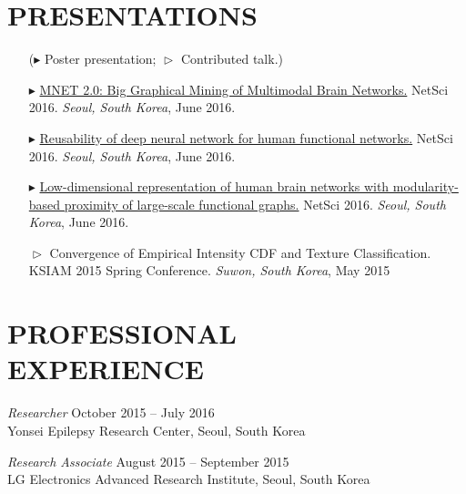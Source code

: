 \documentclass[margin, 10pt]{res} %
\begin{document}
\begin{resume}
\section{\sf PRESENTATIONS}

\begin{itemize}
	\item[]($\blacktriangleright$ Poster presentation; $\vartriangleright$ Contributed talk.)
	\item[$\blacktriangleright$] 
	\href{http://kyoustat.com/presentation/2016_NetSci_MNET.pdf}{MNET 2.0: Big Graphical Mining of Multimodal Brain Networks.} NetSci 2016. \emph{Seoul, South Korea}, June 2016.
	\item[$\blacktriangleright$]
	\href{http://kyoustat.com/presentation/2016_NetSci_DeepLearning.pdf}{Reusability of deep neural network for human functional networks.} NetSci 2016. \emph{Seoul, South Korea}, June 2016.
	\item[$\blacktriangleright$] 
	\href{http://kyoustat.com/presentation/2016_NetSci_LAMP.pdf}{Low-dimensional representation of human brain networks with modularity-based proximity of large-scale functional graphs.} NetSci 2016. \emph{Seoul, South Korea}, June 2016.
	\item[$\vartriangleright$]
	Convergence of Empirical Intensity CDF and Texture Classification. KSIAM 2015 Spring Conference. \emph{Suwon, South Korea}, May 2015
\end{itemize}


\section{\sf PROFESSIONAL \\ EXPERIENCE} 

{\sl Researcher} \hfill October 2015 -- July 2016 \\
Yonsei Epilepsy Research Center, Seoul, South Korea

{\sl Research Associate} \hfill August 2015 -- September 2015 \\
LG Electronics Advanced Research Institute, Seoul, South Korea


\end{resume}
\end{document}

